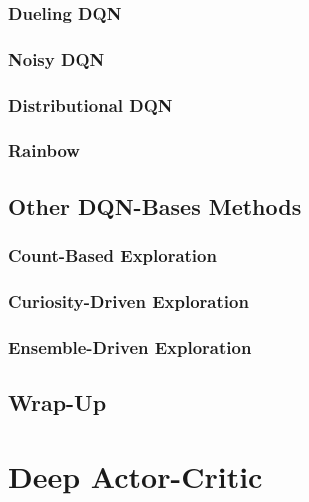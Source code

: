 		\subsection{Dueling \acs{DQN}} %

		\subsection{Noisy \acs{DQN}} %

		\subsection{Distributional \acs{DQN}} %

		\subsection{Rainbow} %

	\section{Other \acs{DQN}-Bases Methods} %

		\subsection{Count-Based Exploration} %

		\subsection{Curiosity-Driven Exploration} %

		\subsection{Ensemble-Driven Exploration} %

	\section{Wrap-Up} %

\chapter{Deep Actor-Critic} %

